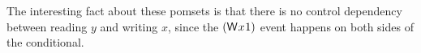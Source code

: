 The interesting fact about these pomsets is that there is no control dependency between
reading $y$ and writing $x$, since the $(\DW{x}{1})$ event happens on both sides of the conditional.

